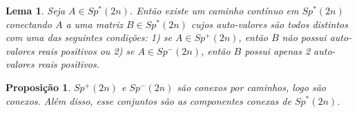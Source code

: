 \documentclass[12pt]{book}
\newtheorem{lema}[teorema]{Lema}
\newtheorem{proposicao}[teorema]{Proposição}
\newcommand{\gruposimpleticonaodegenerado}[1]{Sp^{#1}(2n)}
\begin{document}
	\begin{lema}\label{lema_conectividade_grupo_simlpetico_nao_degenerado}
		Seja $A\in \gruposimpleticonaodegenerado{*}$. Então existe um caminho contínuo em $\gruposimpleticonaodegenerado{*}$ conectando $A$ a uma matriz $B \in \gruposimpleticonaodegenerado{*}$ cujos  auto-valores são todos distintos com uma das seguintes condições: 1) se $A\in \gruposimpleticonaodegenerado{+}$, então $B$ não possui auto-valores reais positivos ou 2) se $A\in \gruposimpleticonaodegenerado{-}$, então $B$ possui apenas 2 auto-valores reais positivos.
	\end{lema}
	
	\begin{proposicao}\label{proposicao_desconexidade_grupo_simpletico_nao_degenerado}
		$ \gruposimpleticonaodegenerado{+}$ e $\gruposimpleticonaodegenerado{-}$ são conexos por caminhos, logo são conexos. Além disso, esse conjuntos são as componentes conexas de $\gruposimpleticonaodegenerado{*} $.
	\end{proposicao}
\end{document}
